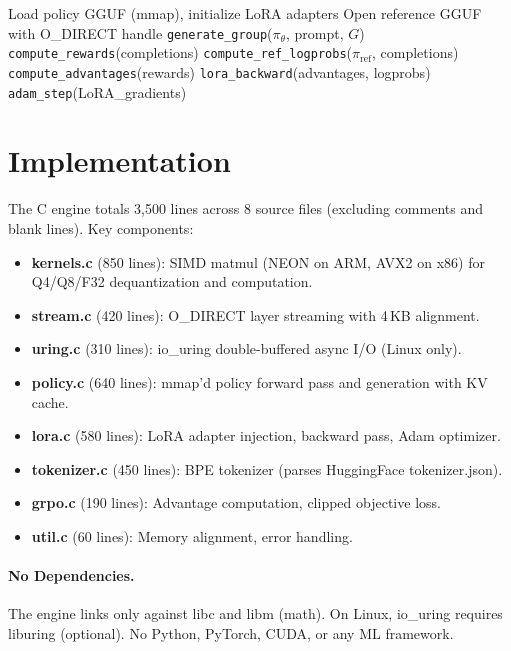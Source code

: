 \documentclass[sigconf,review,anonymous]{acmart}
\begin{document}
\begin{algorithm}
\caption{\textsc{StreamGRPO} Training Loop}
\begin{algorithmic}[1]
\State Load policy GGUF (mmap), initialize LoRA adapters
\State Open reference GGUF with O\_DIRECT handle
      \State \texttt{generate\_group}($\pi_\theta$, prompt, $G$)  
      \State \texttt{compute\_rewards}(completions)  
      \State \texttt{compute\_ref\_logprobs}($\pi_{\text{ref}}$, completions)  
      \State \texttt{compute\_advantages}(rewards)
      \State \texttt{lora\_backward}(advantages, logprobs)
    \EndFor
    \State \texttt{adam\_step}(LoRA\_gradients)
  \EndFor
\EndFor
\end{algorithmic}
\end{algorithm}

\section{Implementation}

The C engine totals 3,500 lines across 8 source files (excluding comments and blank lines). Key components:

\begin{itemize}
\item \textbf{kernels.c} (850 lines): SIMD matmul (NEON on ARM, AVX2 on x86) for Q4/Q8/F32 dequantization and computation.
\item \textbf{stream.c} (420 lines): O\_DIRECT layer streaming with 4\,KB alignment.
\item \textbf{uring.c} (310 lines): io\_uring double-buffered async I/O (Linux only).
\item \textbf{policy.c} (640 lines): mmap'd policy forward pass and generation with KV cache.
\item \textbf{lora.c} (580 lines): LoRA adapter injection, backward pass, Adam optimizer.
\item \textbf{tokenizer.c} (450 lines): BPE tokenizer (parses HuggingFace tokenizer.json).
\item \textbf{grpo.c} (190 lines): Advantage computation, clipped objective loss.
\item \textbf{util.c} (60 lines): Memory alignment, error handling.
\end{itemize}

\paragraph{No Dependencies.} The engine links only against libc and libm (math). On Linux, io\_uring requires liburing (optional). No Python, PyTorch, CUDA, or any ML framework.
\end{document}
